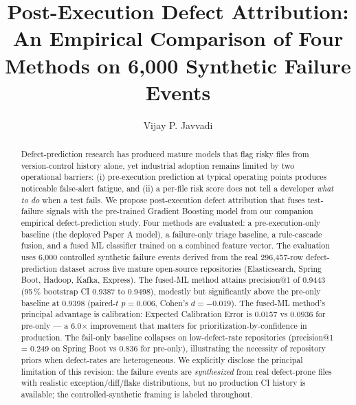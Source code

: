 \documentclass[sigconf,nonacm,review]{acmart}
\begin{document}
\title{Post-Execution Defect Attribution: An Empirical Comparison of Four Methods on 6,000 Synthetic Failure Events}

\author{Vijay P. Javvadi}

\renewcommand{\shortauthors}{Javvadi}

\begin{abstract}
\noindent Defect-prediction research has produced mature models that flag
risky files from version-control history alone, yet industrial adoption
remains limited by two operational barriers: (i) pre-execution prediction
at typical operating points produces noticeable false-alert fatigue, and
(ii) a per-file risk score does not tell a developer \emph{what to do}
when a test fails. We propose post-execution defect attribution
that fuses test-failure signals with the pre-trained Gradient Boosting
model from our companion empirical defect-prediction study. Four methods
are evaluated: a pre-execution-only baseline (the deployed Paper A
model), a failure-only triage baseline, a rule-cascade fusion, and a
fused ML classifier trained on a combined feature vector. The evaluation
uses 6{,}000 controlled synthetic failure events derived from the real
296{,}457-row defect-prediction dataset across five mature open-source
repositories (Elasticsearch, Spring Boot, Hadoop, Kafka, Express).
The fused-ML method attains precision@1 of 0.9443 (95\,\% bootstrap CI
0.9387 to 0.9498), modestly but significantly above the pre-only
baseline at 0.9398 (paired-$t$ $p=0.006$, Cohen's $d=-0.019$). The
fused-ML method's principal advantage is calibration: Expected
Calibration Error is 0.0157 vs 0.0936 for pre-only --- a 6.0$\times$
improvement that matters for prioritization-by-confidence in
production. The fail-only baseline collapses on low-defect-rate
repositories (precision@1 = 0.249 on Spring Boot vs 0.836 for
pre-only), illustrating the necessity of repository priors when
defect-rates are heterogeneous. We explicitly disclose the principal
limitation of this revision: the failure events are
\emph{synthesized} from real defect-prone files with realistic
exception/diff/flake distributions, but no production CI history is
available; the controlled-synthetic framing is labeled throughout.
\end{abstract}

\end{document}
